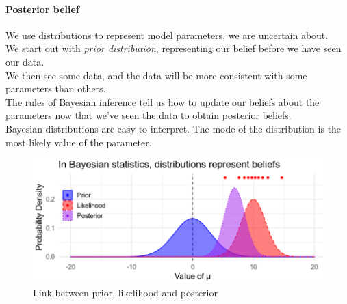\paragraph{Posterior belief}
We use distributions to represent model parameters, we are uncertain about.\\
We start out with \emph{prior distribution}, representing our belief before we have seen 
our data.\\
We then see some data, and the data will be more consistent with some parameters than 
others.\\
The rules of Bayesian inference tell us how to update our beliefs about the parameters now
that we've seen the data to obtain posterior beliefs.\\
Bayesian distributions are easy to interpret. The mode of the distribution is the most 
likely value of the parameter.
\begin{figure}[H]
	\begin{center}
		\includegraphics[width=\textwidth]{./chaps/10sec/images/2_posterior_belief.png}
	\end{center}
	\caption{Link between prior, likelihood and posterior}
	\label{fig:2_posterior_belief}
\end{figure}


